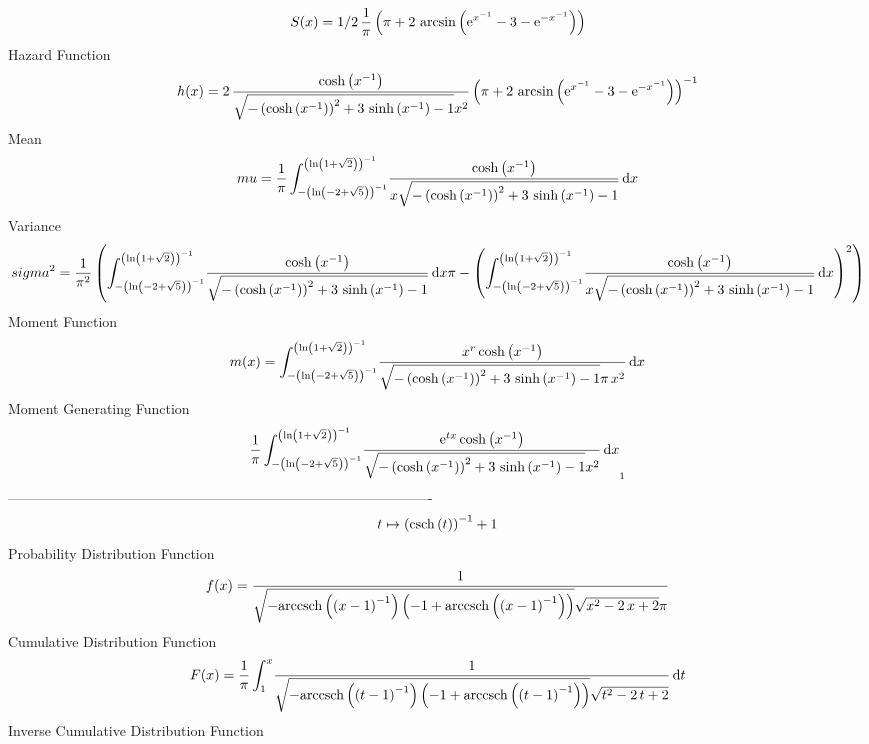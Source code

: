 \documentclass[12pt]{article}
\begin{document}
 $$ S(x)=1/2\,{\frac {1}{\pi} \left( \pi+2\,\arcsin \left( {{\rm e}^{{x}^{-1}}}
-3-{{\rm e}^{-{x}^{-1}}} \right)  \right) }
$$ Hazard Function 
 $$ h(x)=2\,{\frac {\cosh \left( {x}^{-1} \right) }{\sqrt {- \left( \cosh
 \left( {x}^{-1} \right)  \right) ^{2}+3\,\sinh \left( {x}^{-1}
 \right) -1}{x}^{2}} \left( \pi+2\,\arcsin \left( {{\rm e}^{{x}^{-1}}}
-3-{{\rm e}^{-{x}^{-1}}} \right)  \right) ^{-1}}
$$ Mean 
 $$ mu={\frac {1}{\pi}\int_{- \left( \ln  \left( -2+\sqrt {5} \right) 
 \right) ^{-1}}^{ \left( \ln  \left( 1+\sqrt {2} \right)  \right) ^{-1
}}\!{\frac {\cosh \left( {x}^{-1} \right) }{x\sqrt {- \left( \cosh
 \left( {x}^{-1} \right)  \right) ^{2}+3\,\sinh \left( {x}^{-1}
 \right) -1}}}\,{\rm d}x}
$$ Variance 
 $$ sigma^2 = {\frac {1}{{\pi}^{2}} \left( \int_{- \left( \ln  \left( -2+\sqrt {5}
 \right)  \right) ^{-1}}^{ \left( \ln  \left( 1+\sqrt {2} \right) 
 \right) ^{-1}}\!{\frac {\cosh \left( {x}^{-1} \right) }{\sqrt {-
 \left( \cosh \left( {x}^{-1} \right)  \right) ^{2}+3\,\sinh \left( {x
}^{-1} \right) -1}}}\,{\rm d}x\pi- \left( \int_{- \left( \ln  \left( -
2+\sqrt {5} \right)  \right) ^{-1}}^{ \left( \ln  \left( 1+\sqrt {2}
 \right)  \right) ^{-1}}\!{\frac {\cosh \left( {x}^{-1} \right) }{x
\sqrt {- \left( \cosh \left( {x}^{-1} \right)  \right) ^{2}+3\,\sinh
 \left( {x}^{-1} \right) -1}}}\,{\rm d}x \right) ^{2} \right) }
$$ Moment Function 
 $$ m(x) = \int_{- \left( \ln  \left( -2+\sqrt {5} \right)  \right) ^{-1}}^{
 \left( \ln  \left( 1+\sqrt {2} \right)  \right) ^{-1}}\!{\frac {{x}^{
r}\cosh \left( {x}^{-1} \right) }{\sqrt {- \left( \cosh \left( {x}^{-1
} \right)  \right) ^{2}+3\,\sinh \left( {x}^{-1} \right) -1}\pi\,{x}^{
2}}}\,{\rm d}x
$$ Moment Generating Function 
 $${\frac {1}{\pi}\int_{- \left( \ln  \left( -2+\sqrt {5} \right) 
 \right) ^{-1}}^{ \left( \ln  \left( 1+\sqrt {2} \right)  \right) ^{-1
}}\!{\frac {{{\rm e}^{tx}}\cosh \left( {x}^{-1} \right) }{\sqrt {-
 \left( \cosh \left( {x}^{-1} \right)  \right) ^{2}+3\,\sinh \left( {x
}^{-1} \right) -1}{x}^{2}}}\,{\rm d}x}_{{1}}
$$-------------------------------------------------------------------------------------------  \\$$t\mapsto  \left( {\rm csch} \left(t\right) \right) ^{-1}+1
$$Probability Distribution Function 
$$  f(x)={\frac {1}{\sqrt {-{\rm arccsch} \left( \left( x-1 \right) ^{-1}
\right) \left( -1+{\rm arccsch} \left( \left( x-1 \right) ^{-1}\right)
 \right) }\sqrt {{x}^{2}-2\,x+2}\pi}}
$$Cumulative Distribution Function  
 $$F(x)={\frac {1}{\pi}\int_{1}^{x}\!{\frac {1}{\sqrt {-{\rm arccsch} \left(
 \left( t-1 \right) ^{-1}\right) \left( -1+{\rm arccsch} \left(
 \left( t-1 \right) ^{-1}\right) \right) }\sqrt {{t}^{2}-2\,t+2}}}
\,{\rm d}t}
$$ Inverse Cumulative Distribution Function 
\end{document}
